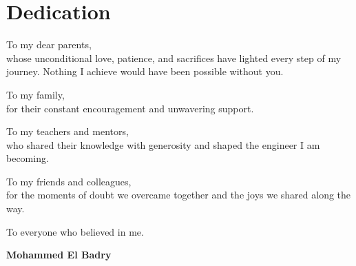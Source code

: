 \newpage
\thispagestyle{empty}
\mbox{} %

\chapter*{Dedication}

\vspace{1.5cm}

\begin{center}
\itshape\large

To my dear parents,\\
whose unconditional love, patience, and sacrifices
have lighted every step of my journey.
Nothing I achieve would have been possible without you.

\vspace{1cm}

To my family,\\
for their constant encouragement and unwavering support.

\vspace{1cm}

To my teachers and mentors,\\
who shared their knowledge with generosity
and shaped the engineer I am becoming.

\vspace{1cm}

To my friends and colleagues,\\
for the moments of doubt we overcame together
and the joys we shared along the way.

\vspace{1cm}

To everyone who believed in me.

\vspace{2cm}

\upshape\normalsize\bfseries Mohammed El Badry

\end{center}

